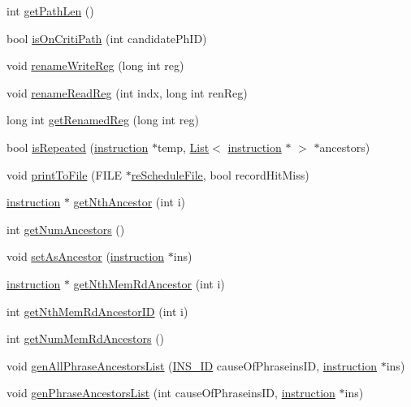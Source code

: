 \begin{DoxyCompactItemize}
\item 
int \hyperlink{classinstruction_ac773a71d9b69171d092da07080735421}{getPathLen} ()
\item 
bool \hyperlink{classinstruction_ae047caa60b7297cd7b07fa773003ba71}{isOnCritiPath} (int candidatePhID)
\item 
void \hyperlink{classinstruction_a696b4ec387bfeb56d4266d08e7bb1627}{renameWriteReg} (long int reg)
\item 
void \hyperlink{classinstruction_ae9760e334e7829c4f8504bc8436e2dfb}{renameReadReg} (int indx, long int renReg)
\item 
long int \hyperlink{classinstruction_a35b2a3db2dc9a22bbdcbce797d510c85}{getRenamedReg} (long int reg)
\item 
bool \hyperlink{classinstruction_a8d938a7c74c2bd36d0e5565cf933d9d5}{isRepeated} (\hyperlink{classinstruction}{instruction} $\ast$temp, \hyperlink{classList}{List}$<$ \hyperlink{classinstruction}{instruction} $\ast$ $>$ $\ast$ancestors)
\item 
void \hyperlink{classinstruction_a32e2f2aa8991ac0d69ce22e728bdea4d}{printToFile} (FILE $\ast$\hyperlink{bkEnd_8cpp_a0e5f51d6a6b1d82437b223b600c984c2}{reScheduleFile}, bool recordHitMiss)
\item 
\hyperlink{classinstruction}{instruction} $\ast$ \hyperlink{classinstruction_aee9c18eaa3dfe56eacc82ac31b8231d5}{getNthAncestor} (int i)
\item 
int \hyperlink{classinstruction_a2e29e3536ad20c65b6c7b76ba6e37ad8}{getNumAncestors} ()
\item 
void \hyperlink{classinstruction_aee7e55cf32812b46267a22bcb53da670}{setAsAncestor} (\hyperlink{classinstruction}{instruction} $\ast$ins)
\item 
\hyperlink{classinstruction}{instruction} $\ast$ \hyperlink{classinstruction_ade9345ce46d71d566971798ea924a325}{getNthMemRdAncestor} (int i)
\item 
int \hyperlink{classinstruction_aca2f7cc96da470bc99d4c1f0a66646ed}{getNthMemRdAncestorID} (int i)
\item 
int \hyperlink{classinstruction_a2a1e30e887dabbb7b60cc71a1d466105}{getNumMemRdAncestors} ()
\item 
void \hyperlink{classinstruction_a558367dae55d2970723dc81c6b498be2}{genAllPhraseAncestorsList} (\hyperlink{global_2global_8h_a1883c47d0023d0f200e1d86eced6a070}{INS\_\-ID} causeOfPhraseinsID, \hyperlink{classinstruction}{instruction} $\ast$ins)
\item 
void \hyperlink{classinstruction_af5a1d9e1a8a25f768c3dadf66fb83362}{genPhraseAncestorsList} (int causeOfPhraseinsID, \hyperlink{classinstruction}{instruction} $\ast$ins)

\end{DoxyCompactItemize}
